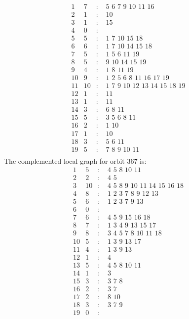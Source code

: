 \documentclass[12pt]{article}
\begin{document}
\begin{equation*}
\begin{array}{rrcl}
1&7&:&\,\,5\,\,6\,\,7\,\,9\,\,10\,\,11\,\,16\\
2&1&:&\,\,10\\
3&1&:&\,\,15\\
4&0&:&\\
5&5&:&\,\,1\,\,7\,\,10\,\,15\,\,18\\
6&6&:&\,\,1\,\,7\,\,10\,\,14\,\,15\,\,18\\
7&5&:&\,\,1\,\,5\,\,6\,\,11\,\,19\\
8&5&:&\,\,9\,\,10\,\,14\,\,15\,\,19\\
9&4&:&\,\,1\,\,8\,\,11\,\,19\\
10&9&:&\,\,1\,\,2\,\,5\,\,6\,\,8\,\,11\,\,16\,\,17\,\,19\\
11&10&:&\,\,1\,\,7\,\,9\,\,10\,\,12\,\,13\,\,14\,\,15\,\,18\,\,19\\
12&1&:&\,\,11\\
13&1&:&\,\,11\\
14&3&:&\,\,6\,\,8\,\,11\\
15&5&:&\,\,3\,\,5\,\,6\,\,8\,\,11\\
16&2&:&\,\,1\,\,10\\
17&1&:&\,\,10\\
18&3&:&\,\,5\,\,6\,\,11\\
19&5&:&\,\,7\,\,8\,\,9\,\,10\,\,11\\
\end{array}
\end{equation*}
The complemented local graph for orbit $367$ is:
\begin{equation*}
\begin{array}{rrcl}
1&5&:&\,\,4\,\,5\,\,8\,\,10\,\,11\\
2&2&:&\,\,4\,\,5\\
3&10&:&\,\,4\,\,5\,\,8\,\,9\,\,10\,\,11\,\,14\,\,15\,\,16\,\,18\\
4&8&:&\,\,1\,\,2\,\,3\,\,7\,\,8\,\,9\,\,12\,\,13\\
5&6&:&\,\,1\,\,2\,\,3\,\,7\,\,9\,\,13\\
6&0&:&\\
7&6&:&\,\,4\,\,5\,\,9\,\,15\,\,16\,\,18\\
8&7&:&\,\,1\,\,3\,\,4\,\,9\,\,13\,\,15\,\,17\\
9&8&:&\,\,3\,\,4\,\,5\,\,7\,\,8\,\,10\,\,11\,\,18\\
10&5&:&\,\,1\,\,3\,\,9\,\,13\,\,17\\
11&4&:&\,\,1\,\,3\,\,9\,\,13\\
12&1&:&\,\,4\\
13&5&:&\,\,4\,\,5\,\,8\,\,10\,\,11\\
14&1&:&\,\,3\\
15&3&:&\,\,3\,\,7\,\,8\\
16&2&:&\,\,3\,\,7\\
17&2&:&\,\,8\,\,10\\
18&3&:&\,\,3\,\,7\,\,9\\
19&0&:&\\
\end{array}
\end{equation*}
\end{document}
